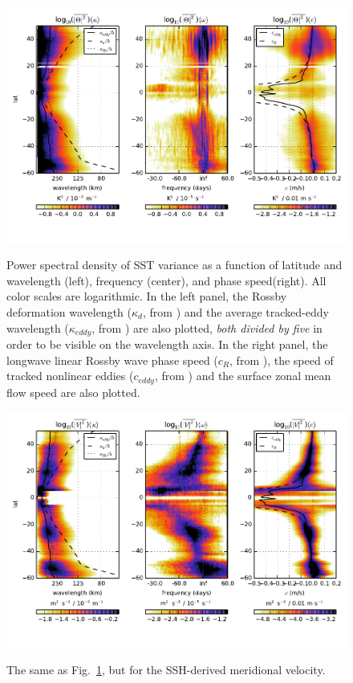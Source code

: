 \documentclass[10pt]{article}
\begin{document}
\begin{figure}[t]
  \noindent\includegraphics{../figures/SAT_50degwide/integrated_spectra_T.pdf}\\
  \caption{Power spectral density of SST variance as a function of latitude and wavelength (left), frequency (center), and phase speed(right). All color scales are logarithmic. In the left panel, the Rossby deformation wavelength ($\kappa_d$, from \citealt{TullochEtAl2011}) and the average tracked-eddy wavelength ($\kappa_{eddy}$, from \citealt{CheltonEtAl2011}) are also plotted, {\em both divided by five} in order to be visible on the wavelength axis. In the right panel, the longwave linear Rossby wave phase speed ($c_R$, from \citealt{TullochEtAl2011}), the speed of tracked nonlinear eddies ($c_{eddy}$, from \citealt{CheltonEtAl2011}) and the surface zonal mean flow speed are also plotted.}
  \label{fig:integrated_spectra_T}
\end{figure}

\begin{figure}[t]
  \noindent\includegraphics{../figures/SAT_50degwide/integrated_spectra_V.pdf}\\
  \caption{The same as Fig.~\ref{fig:integrated_spectra_T}, but for the SSH-derived meridional velocity.}
  \label{fig:integrated_spectra_V}
\end{figure}
\end{document}
